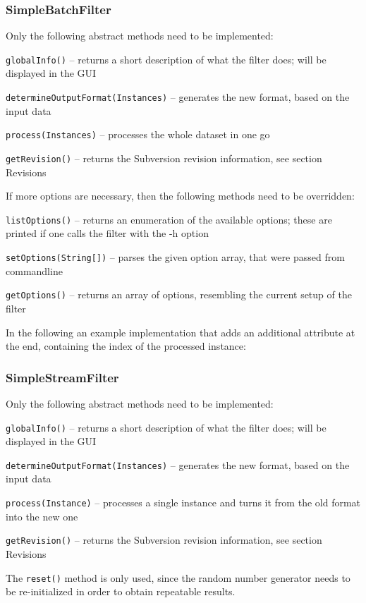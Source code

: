 \subsubsection{SimpleBatchFilter}
Only the following abstract methods need to be implemented:
\begin{tight_itemize}
  \item \texttt{globalInfo()} -- returns a short description of what the
filter does; will be displayed in the GUI
  \item \texttt{determineOutputFormat(Instances)} -- generates the new
format, based on the input data
  \item \texttt{process(Instances)} -- processes the whole dataset in one
go
  \item \texttt{getRevision()} -- returns the Subversion revision information,
see section Revisions
\end{tight_itemize}
If more options are necessary, then the following methods need to be overridden:
\begin{tight_itemize}
  \item \texttt{listOptions()} -- returns an enumeration of the available
options; these are printed if one calls the filter with the -h option
  \item \texttt{setOptions(String[])} -- parses the given option array,
that were passed from commandline
  \item \texttt{getOptions()} -- returns an array of options, resembling
the current setup of the filter
\end{tight_itemize}

\newpage
In the following an example implementation that adds an additional attribute at
the end, containing the index of the processed instance:

{\footnotesize }

\newpage
\subsubsection{SimpleStreamFilter}
Only the following abstract methods need to be implemented:
\begin{tight_itemize}
  \item \texttt{globalInfo()} -- returns a short description of what the filter
does; will be displayed in the GUI
  \item \texttt{determineOutputFormat(Instances)} -- generates the new
format, based on the input data
  \item \texttt{process(Instance)} -- processes a single instance and turns it
from the old format into the new one
  \item \texttt{getRevision()} -- returns the Subversion revision
information, see section Revisions
\end{tight_itemize}
The \texttt{reset()} method is only used, since the random number generator
needs to be re-initialized in order to obtain repeatable results.

